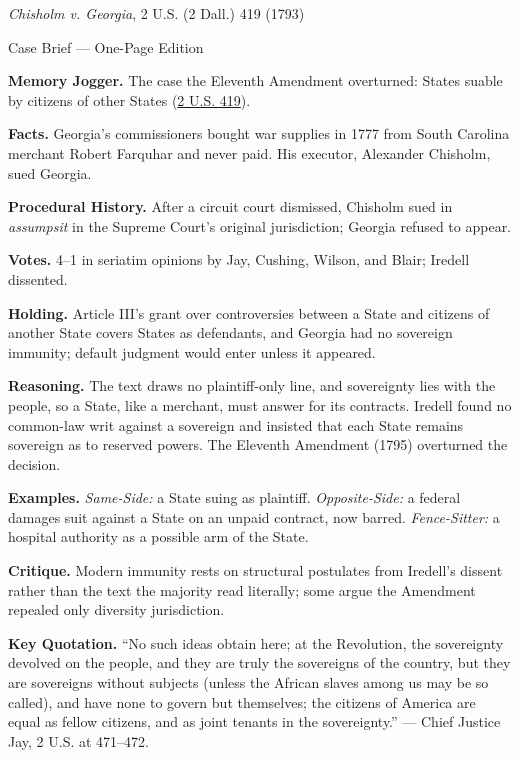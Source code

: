 \documentclass[12pt]{article}
\begin{document}
\begin{center}
{\Large \textit{Chisholm v. Georgia}, 2 U.S. (2 Dall.) 419 (1793)\par}
\vspace{0.3em}
{\normalsize Case Brief --- One-Page Edition\par}
\end{center}

\textbf{Memory Jogger.} The case the Eleventh Amendment overturned: States suable by citizens of other States (\href{https://supreme.justia.com/cases/federal/us/2/419/}{2 U.S. 419}).

\textbf{Facts.} Georgia's commissioners bought war supplies in 1777 from South Carolina merchant Robert Farquhar and never paid. His executor, Alexander Chisholm, sued Georgia.

\textbf{Procedural History.} After a circuit court dismissed, Chisholm sued in \emph{assumpsit} in the Supreme Court's original jurisdiction; Georgia refused to appear.

\textbf{Votes.} 4--1 in seriatim opinions by Jay, Cushing, Wilson, and Blair; Iredell dissented.

\textbf{Holding.} Article III's grant over controversies between a State and citizens of another State covers States as defendants, and Georgia had no sovereign immunity; default judgment would enter unless it appeared.

\textbf{Reasoning.} The text draws no plaintiff-only line, and sovereignty lies with the people, so a State, like a merchant, must answer for its contracts. Iredell found no common-law writ against a sovereign and insisted that each State remains sovereign as to reserved powers. The Eleventh Amendment (1795) overturned the decision.

\textbf{Examples.} \emph{Same-Side:} a State suing as plaintiff. \emph{Opposite-Side:} a federal damages suit against a State on an unpaid contract, now barred. \emph{Fence-Sitter:} a hospital authority as a possible arm of the State.

\textbf{Critique.} Modern immunity rests on structural postulates from Iredell's dissent rather than the text the majority read literally; some argue the Amendment repealed only diversity jurisdiction.

\textbf{Key Quotation.} ``No such ideas obtain here; at the Revolution, the sovereignty devolved on the people, and they are truly the sovereigns of the country, but they are sovereigns without subjects (unless the African slaves among us may be so called), and have none to govern but themselves; the citizens of America are equal as fellow citizens, and as joint tenants in the sovereignty.'' --- Chief Justice Jay, 2 U.S. at 471--472.
\end{document}
